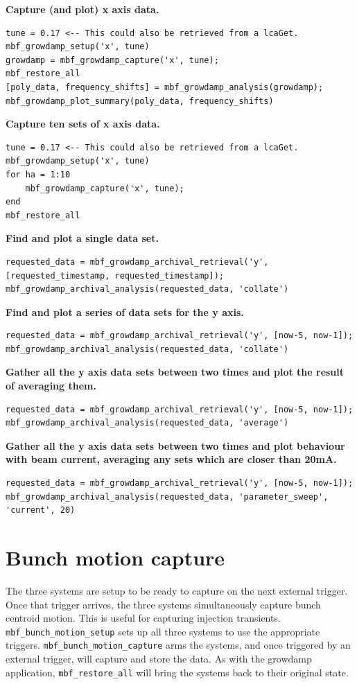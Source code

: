 \documentclass{report}
\begin{document}
\textbf{Capture (and plot) x axis data.}
\begin{verbatim}
tune = 0.17 <-- This could also be retrieved from a lcaGet.
mbf_growdamp_setup('x', tune)
growdamp = mbf_growdamp_capture('x', tune);
mbf_restore_all
[poly_data, frequency_shifts] = mbf_growdamp_analysis(growdamp);
mbf_growdamp_plot_summary(poly_data, frequency_shifts)
\end{verbatim}
\textbf{Capture ten sets of x axis data.}
\begin{verbatim}
tune = 0.17 <-- This could also be retrieved from a lcaGet.
mbf_growdamp_setup('x', tune)
for ha = 1:10
    mbf_growdamp_capture('x', tune);
end
mbf_restore_all
\end{verbatim}

\textbf{Find and plot a single data set.}
\begin{verbatim}
requested_data = mbf_growdamp_archival_retrieval('y', [requested_timestamp, requested_timestamp]);
mbf_growdamp_archival_analysis(requested_data, 'collate')
\end{verbatim}

\textbf{Find and plot a series of data sets for the y axis.}
\begin{verbatim}
requested_data = mbf_growdamp_archival_retrieval('y', [now-5, now-1]);
mbf_growdamp_archival_analysis(requested_data, 'collate')
\end{verbatim}

\textbf{Gather all the y axis data sets between two times and plot the result of averaging them.}
\begin{verbatim}
requested_data = mbf_growdamp_archival_retrieval('y', [now-5, now-1]);
mbf_growdamp_archival_analysis(requested_data, 'average')
\end{verbatim}

\textbf{Gather all the y axis data sets between two times and plot behaviour with beam current, averaging any sets which are closer than 20mA.}
\begin{verbatim}
requested_data = mbf_growdamp_archival_retrieval('y', [now-5, now-1]);
mbf_growdamp_archival_analysis(requested_data, 'parameter_sweep', 'current', 20)
\end{verbatim}

\chapter{Bunch motion capture}
The three systems are setup to be ready to capture on the next external trigger. Once that trigger arrives, the three systems simultaneously capture bunch centroid motion. This is useful for capturing injection transients. \verb|mbf_bunch_motion_setup| sets up all three systems to use the appropriate triggers. \verb|mbf_bunch_motion_capture| arms the systems, and once triggered by an external trigger, will capture and store the data. As with the growdamp application, \verb|mbf_restore_all| will bring the systems back to their original state.
\end{document}

